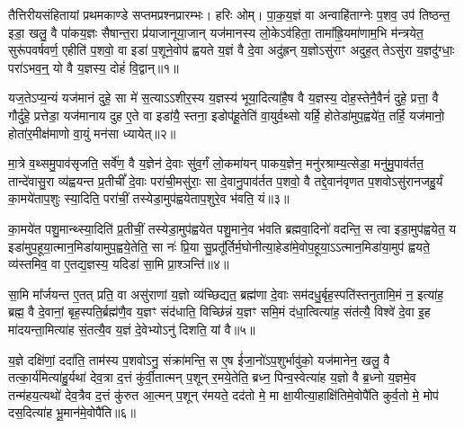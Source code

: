 {\anuvakamend[{वृ॒त्र॒हत्ये\-ऽनु॑ गाय॒त्रिणो᳚\-ऽध्व॒राणां᳚ परा॒वतो॒\-ऽस्याम॒ष्टाच॑त्वारिꣳशच्च॥12॥}]}

\setcounter{anuvakam}{0}
तैत्तिरीयसंहितायां प्रथमकाण्डे सप्तमप्रश्नप्रारम्भः। हरिः ओम्। पा॒क॒य॒ज्ञं वा अन्वाहि॑ताग्नेः प॒शव॒ उप॑ तिष्ठन्त॒ इडा॒ खलु॒ वै पा॑कय॒ज्ञः सैषान्त॒रा प्र॑याजानूया॒जान् यज॑मानस्य लो॒के\-ऽव॑हिता॒ तामा᳚ह्रि॒यमा॑णाम॒भि म॑न्त्रयेत॒ सुरू॑पवर्\mbox{}षवर्ण॒ एहीति॑ प॒शवो॒ वा इडा॑ प॒शूने॒वोप॑ ह्वयते य॒ज्ञं वै दे॒वा अदु॑ह्रन् य॒ज्ञो\-ऽसु॑राꣳ अदुह॒त् ते\-ऽसु॑रा य॒ज्ञदु॑ग्धाः॒ परा॑\-ऽभव॒न्॒ यो वै य॒ज्ञस्य॒ दोहं॑ वि॒द्वान्॥१॥

यज॒ते\-ऽप्य॒न्यं यज॑मानं दुहे॒ सा मे॑ स॒त्या\-ऽ\-ऽशीर॒स्य य॒ज्ञस्य॑ भूया॒दित्या॑है॒ष वै य॒ज्ञस्य॒ दोह॒स्तेनै॒वैनं॑ दुहे॒ प्रत्ता॒ वै गौर्दु॑हे॒ प्रत्तेडा॒ यज॑मानाय दुह ए॒ते वा इडा॑यै॒ स्तना॒ इडोप॑हू॒तेति॑ वा॒युर्व॒थ्सो यर्\mbox{}हि॒ होतेडा॑मुप॒ह्वये॑त॒ तर्\mbox{}हि॒ यज॑मानो॒ होता॑र॒मीक्ष॑माणो वा॒युं मन॑सा ध्यायेत्॥२॥

मा॒त्रे व॒थ्समु॒पाव॑सृजति॒ सर्वे॑ण॒ वै य॒ज्ञेन॑ दे॒वाः सु॑व॒र्गं लो॒कमा॑यन् पाकय॒ज्ञेन॒ मनु॑रश्राम्य॒त्सेडा॒ मनु॑मु॒पाव॑र्तत॒ तान्दे॑वासु॒रा व्य॑ह्वयन्त प्र॒तीचीं᳚ दे॒वाः परा॑ची॒मसु॑राः॒ सा दे॒वानु॒पाव॑र्तत प॒शवो॒ वै तद्दे॒वान॑वृणत प॒शवो\-ऽसु॑रानजहु॒र्यं का॒मये॑ताप॒शुः स्या॒दिति॒ परा॑चीं॒ तस्येडा॒मुप॑ह्वयेताप॒शुरे॒व भ॑वति॒ यं॥३॥

का॒मये॑त पशु॒मान्थ्स्या॒दिति॑ प्र॒तीचीं॒ तस्येडा॒मुप॑ह्वयेत पशु॒माने॒व भ॑वति ब्रह्मवा॒दिनो॑ वदन्ति॒ स त्वा इडा॒मुप॑ह्वयेत॒ य इडा॑मुप॒हूया॒त्मान॒मिडा॑यामुप॒ह्वये॒तेति॒ सा नः॑ प्रि॒या सु॒प्रतू᳚र्तिर्म॒घोनीत्या॒हेडा॑मे॒वोप॒हूया॒\-ऽ\-ऽत्मान॒मिडा॑या॒मुप॑ ह्वयते॒ व्य॑स्तमिव॒ वा ए॒तद्य॒ज्ञस्य॒ यदिडा॑ सा॒मि प्रा॒श्ञन्ति॑॥४॥

सा॒मि मा᳚र्जयन्त ए॒तत् प्रति॒ वा असु॑राणां य॒ज्ञो व्य॑च्छिद्यत॒ ब्रह्म॑णा दे॒वाः सम॑दधु॒र्बृह॒स्पति॑स्तनुतामि॒मं न॒ इत्या॑ह॒ ब्रह्म॒ वै दे॒वानां॒ बृह॒स्पति॒र्ब्रह्म॑णै॒व य॒ज्ञꣳ संद॑धाति॒ विच्छि॑न्नं य॒ज्ञꣳ समि॒मं द॑धा॒त्वित्या॑ह॒ संत॑त्यै॒ विश्वे॑ दे॒वा इ॒ह मा॑दयन्ता॒मित्या॑ह सं॒तत्यै॒व य॒ज्ञं दे॒वेभ्यो\-ऽनु॑ दिशति॒ यां वै॥५॥

य॒ज्ञे दक्षि॑णां॒ ददा॑ति॒ ताम॑स्य प॒शवो\-ऽनु॒ संक्रा॑मन्ति॒ स ए॒ष ई॑जा॒नो॑\-ऽप॒शुर्भावु॑को॒ यज॑मानेन॒ खलु॒ वै तत्का॒र्य॑मित्या॑हु॒र्यथा॑ देव॒त्रा द॒त्तं कु॑र्वी॒तात्मन् प॒शून् र॒मये॒तेति॒ ब्रध्न॒ पिन्व॒स्वेत्या॑ह य॒ज्ञो वै ब्र॒ध्नो य॒ज्ञमे॒व तन्म॑हय॒त्यथो॑ देव॒त्रैव द॒त्तं कु॑रुत आ॒त्मन् प॒शून् र॑मयते॒ दद॑तो मे॒ मा क्षा॒यीत्या॒हाक्षि॑तिमे॒वोपै॑ति कुर्व॒तो मे॒ मोप॑ दस॒दित्या॑ह भू॒मान॑मे॒वोपै॑ति॥६॥

